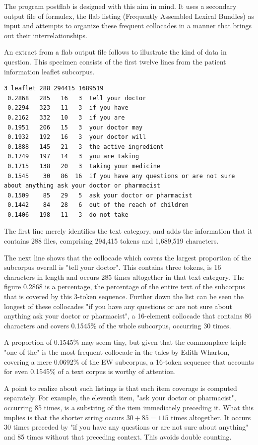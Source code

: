 \documentclass[output=paper]{langscibook}
\begin{document}
The program postflab is designed with this aim in mind. It uses a secondary output file of formulex, the flab listing (Frequently Assembled Lexical Bundles) as input and attempts to organize these frequent collocades in a manner that brings out their interrelationships.

An extract from a flab output file follows to illustrate the kind of data in question. This specimen consists of the first twelve lines from the patient information leaflet subcorpus.

\begin{lstlisting}
3 leaflet 288 294415 1689519
 0.2868   285   16   3  tell your doctor
 0.2294   323   11   3  if you have
 0.2162   332   10   3  if you are
 0.1951   206   15   3  your doctor may
 0.1932   192   16   3  your doctor will
 0.1888   145   21   3  the active ingredient
 0.1749   197   14   3  you are taking
 0.1715   138   20   3  taking your medicine
 0.1545    30   86  16  if you have any questions or are not sure about anything ask your doctor or pharmacist
 0.1509    85   29   5  ask your doctor or pharmacist
 0.1442    84   28   6  out of the reach of children
 0.1406   198   11   3  do not take
\end{lstlisting}

The first line merely identifies the text category, and adds the information that it contains 288 files, comprising 294,415 tokens and 1,689,519 characters.

The next line shows that the collocade which covers the largest proportion of the subcorpus overall is "tell your doctor". This contains three tokens, is 16 characters in length and occurs 285 times altogether in that text category. The figure 0.2868 is a percentage, the percentage of the entire text of the subcorpus that is covered by this 3-token sequence. Further down the list can be seen the longest of these collocades "if you have any questions or are not sure about anything ask your doctor or pharmacist", a 16-element collocade that contains 86 characters and covers 0.1545\% of the whole subcorpus, occurring 30 times.

A proportion of 0.1545\% may seem tiny, but given that the commonplace triple "one of the" is the most frequent collocade in the tales by Edith Wharton, covering a mere 0.0692\% of the EW subcorpus, a 16-token sequence that accounts for even 0.1545\% of a text corpus is worthy of attention.

A point to realize about such listings is that each item coverage is computed separately. For example, the eleventh item, "ask your doctor or pharmacist", occurring 85 times, is a substring of the item immediately preceding it. What this implies is that the shorter string occurs $30+85 = 115$ times altogether. It occurs 30 times preceded by "if you have any questions or are not sure about anything" and 85 times without that preceding context. This avoids double counting.
\end{document}
